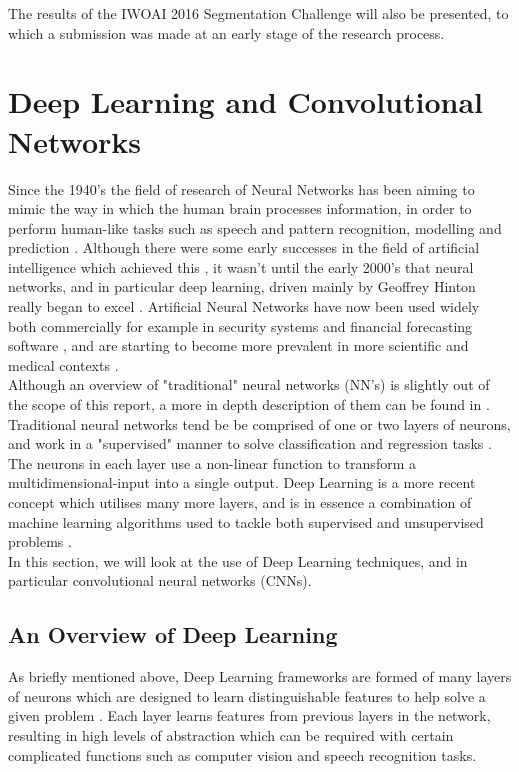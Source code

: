 \documentclass[11pt,a4paper]{memoir}
\numberwithin{figure}{section}
\numberwithin{table}{section}
\numberwithin{equation}{section}
\begin{document}
The results of the IWOAI 2016 Segmentation Challenge \cite{2016InternationalChallenge} will also be presented, to which a submission was made at an early stage of the research process.


\chapter{Deep Learning and Convolutional Networks}
Since the 1940's the field of research of Neural Networks has been aiming to mimic the way in which the human brain processes information, in order to perform human-like tasks such as speech and pattern recognition, modelling and prediction  \cite{VanDerSmagt1996AnNetworks}. Although there were some early successes in the field of artificial intelligence which achieved this \cite{Carpenter1989NeuralMemory}\cite{Lippmann1989ReviewRecognition}, it wasn't until the early 2000's that neural networks, and in particular deep learning, driven mainly by Geoffrey Hinton really began to excel \cite{Hinton2006ANets.}. Artificial Neural Networks have now been used widely both commercially for example in security systems \cite{Korkmaz2016DevelopingSystems} and financial forecasting software \cite{Barunik2016ForecastingNetworks}, and are starting to become more prevalent in more scientific and medical contexts \cite{Zribi2016NeuralMaking}. \\

Although an overview of "traditional" neural networks (NN's) is slightly out of the scope of this report, a more in depth description of them can be found in \cite{Goodfellow-et-al-2016-Book}. Traditional neural networks tend be be comprised of one or two layers of neurons, and work in a "supervised" manner to solve classification and regression tasks \cite{Goodfellow-et-al-2016-Book}. The neurons in each layer use a non-linear function to transform a multidimensional-input into a single output. Deep Learning is a more recent concept which utilises many more layers, and is in essence a combination of machine learning algorithms used to tackle both supervised and unsupervised problems \cite{LeCun2015DeepLearning}.\\

In this section, we will look at the use of Deep Learning techniques, and in particular convolutional neural networks (CNNs).  

\section{An Overview of Deep Learning}
As briefly mentioned above, Deep Learning frameworks are formed of many layers of neurons which are designed to learn distinguishable features to help solve a given problem \cite{LeCun2015DeepLearning}.  Each layer learns features from previous layers in the network, resulting in high levels of abstraction \cite{Egmont-Petersen2002ImageReview} which can be required with certain complicated functions such as computer vision and speech recognition tasks. \\
\end{document}

